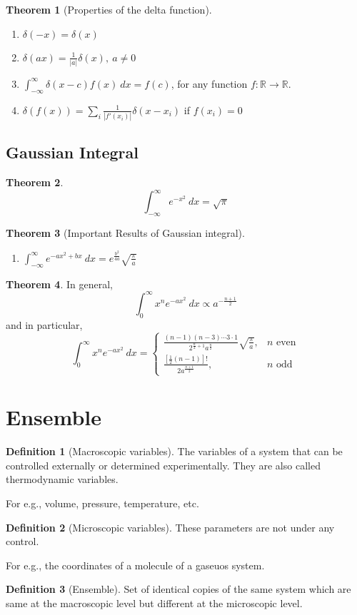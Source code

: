 \documentclass[10pt, a4paper]{extarticle}
\theoremstyle{definition}
\newtheorem{thm}{Theorem}
\newtheorem{defn}{Definition}
\begin{document}
\begin{thm}[Properties of the delta function]
	\hfill
	\begin{enumerate}
		\item $\delta(-x)=\delta(x)$
		\item $\delta(ax)=\frac{1}{|a|}\delta(x),\ a\neq 0$
		\item $\int_{-\infty}^{\infty}\delta(x-c)f(x)\ dx=f(c)$, for any function $f:\mathbb{R}\to\mathbb{R}$.
		\item $\delta(f(x))=\sum_i\frac{1}{|f'(x_i)|}\delta(x-x_i)$ if $f(x_i)=0$
\end{enumerate}
\end{thm}

\subsection{Gaussian Integral}
\begin{thm}
	\[\int_{-\infty}^{\infty}e^{-x^2}\ dx=\sqrt{\pi}\]
\end{thm}

\begin{thm}[Important Results of Gaussian integral]
	\hfill
	\begin{enumerate}
		\item $\int_{-\infty}^{\infty}e^{-ax^2+bx}\ dx=e^{\frac{b^2}{4a}}\sqrt{\frac{\pi}{a}}$
\end{enumerate}
\end{thm}

\begin{thm}
	In general,\[\int_0^\infty x^n e^{-ax^2}\ dx\propto a^{-\frac{n+1}{2}}\]
	and in particular,
	\[\int_0^\infty x^n e^{-ax^2}\ dx=\begin{cases}
		\frac{(n-1)(n-3)\cdots 3\cdot 1}{2^{\frac{n}{2}+1}a^{\frac{n}{2}}}\sqrt{\frac{\pi}{a}},&n\text{ even}\\
		\frac{[\frac{1}{2}(n-1)]!}{2a^{\frac{n+1}{2}}},&n\text{ odd}
	\end{cases}\]
\end{thm}

\section{Ensemble}
\begin{defn}[Macroscopic variables]
	The variables of a system that can be controlled externally or determined experimentally. They are also called thermodynamic variables.

	For e.g., volume, pressure, temperature, etc.
\end{defn}
\begin{defn}[Microscopic variables]
	These parameters are not under any control.

	For e.g., the coordinates of a molecule of a gaseuos system.
\end{defn}
\begin{defn}[Ensemble]
	Set of identical copies of the same system which are same at the macroscopic level but different at the microscopic level.
\end{defn}
\end{document}
